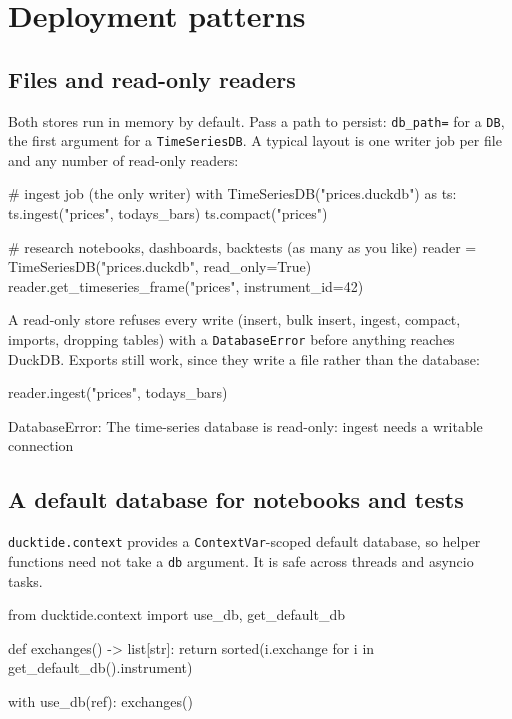 \documentclass[11pt,a4paper]{article}
\newcommand{\code}[1]{\texttt{#1}}
\begin{document}
\section{Deployment patterns}

\subsection{Files and read-only readers}

Both stores run in memory by default. Pass a path to persist: \code{db\_path=} for a
\code{DB}, the first argument for a \code{TimeSeriesDB}.
A typical layout is one writer job per file and any number of read-only readers:

\begin{python}
# ingest job (the only writer)
with TimeSeriesDB("prices.duckdb") as ts:
    ts.ingest("prices", todays_bars)
    ts.compact("prices")

# research notebooks, dashboards, backtests (as many as you like)
reader = TimeSeriesDB("prices.duckdb", read_only=True)
reader.get_timeseries_frame("prices", instrument_id=42)
\end{python}

A read-only store refuses every write (insert, bulk insert, ingest, compact, imports,
dropping tables) with a \code{DatabaseError} before anything reaches DuckDB. Exports still
work, since they write a file rather than the database:

\begin{python}
reader.ingest("prices", todays_bars)
\end{python}
\begin{console}
DatabaseError: The time-series database is read-only: ingest needs a writable connection
\end{console}

\subsection{A default database for notebooks and tests}

\code{ducktide.context} provides a \code{ContextVar}-scoped default database, so helper
functions need not take a \code{db} argument. It is safe across threads and asyncio tasks.

\begin{python}
from ducktide.context import use_db, get_default_db

def exchanges() -> list[str]:
    return sorted({i.exchange for i in get_default_db().instrument})

with use_db(ref):
    exchanges()
\end{python}
\begin{console}
\end{console}
\end{document}
